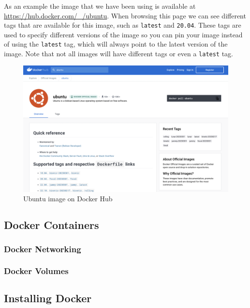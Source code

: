 \documentclass{csse4400}
\begin{document}
As an example the image that we have been using is available at \url{https://hub.docker.com/_/ubuntu}. When browsing this page we can see different tags that are available for this image, such as \texttt{latest} and \texttt{20.04}. These tags are used to specify different versions of the image so you can pin your image instead of using the \texttt{latest} tag, which will always point to the latest version of the image. Note that not all images will have different tags or even a \texttt{latest} tag.

\begin{figure}[H]
  \includegraphics[width=\textwidth]{images/dockerhub}
  \caption{Ubuntu image on Docker Hub}
\end{figure}

\subsection{Docker Containers}


\subsubsection{Docker Networking}


\subsubsection{Docker Volumes}


\subsection{Installing Docker}
\end{document}
